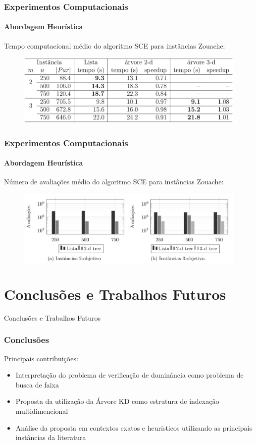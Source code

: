 \documentclass[10pt,xcolor=table,fleqn]{beamer}
\newcommand{\mytitle}[1]{
  \begin{center}
    \color{defblue}
    { \LARGE #1 }
  \end{center}
}
\begin{document}
\begin{frame}
  \frametitle{Experimentos Computacionais}
  \framesubtitle{Abordagem Heurística}
  Tempo computacional médio do algoritmo SCE para instâncias Zouache:
  \begin{figure}
    \centering
    \includegraphics[width=1.0\textwidth]{../tab/sce/cpures}
  \end{figure}
\end{frame}

\begin{frame}
  \frametitle{Experimentos Computacionais}
  \framesubtitle{Abordagem Heurística}
  Número de avaliações médio do algoritmo SCE para instâncias Zouache:
  \begin{figure}
    \centering
    \includegraphics[width=1.0\textwidth]{../tab/sce/cmpres}
  \end{figure}
\end{frame}

\section{Conclusões e Trabalhos Futuros}

\begin{frame}
	\mytitle{Conclusões e Trabalhos Futuros}
\end{frame}

\begin{frame}
	\frametitle{Conclusões}
  \begin{block}{Principais contribuições:}
    \begin{itemize}
      \setlength\itemsep{0.6em}
      \item{ Interpretação do problema de verificação de dominância como problema de busca de faixa }
      \item{ Proposta da utilização da Árvore KD como estrutura de indexação multidimencional }
      \item{ Análise da proposta em contextos exatos e heurísticos utilizando as principais instâncias da literatura}
    \end{itemize}
  \end{block}
\end{frame}
\end{document}
